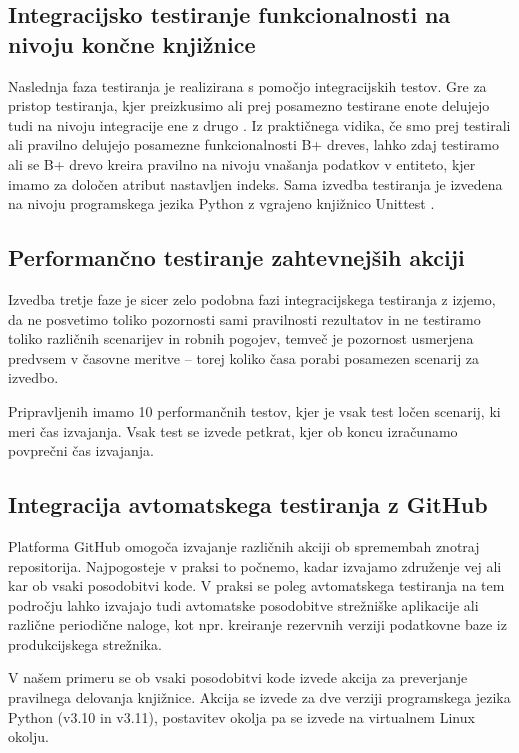 \documentclass[a4paper,12pt,openright]{book}
\begin{document}
   \subsection{Integracijsko testiranje funkcionalnosti na nivoju končne knjižnice}

    Naslednja faza testiranja je realizirana s pomočjo integracijskih testov. Gre za pristop testiranja, kjer preizkusimo ali prej posamezno testirane enote delujejo tudi na nivoju integracije ene z drugo \cite{brar2015differentiating}. Iz praktičnega vidika, če smo prej testirali ali pravilno delujejo posamezne funkcionalnosti B+ dreves, lahko zdaj testiramo ali se B+ drevo kreira pravilno na nivoju vnašanja podatkov v entiteto, kjer imamo za določen atribut nastavljen indeks. Sama izvedba testiranja je izvedena na nivoju programskega jezika Python z vgrajeno knjižnico Unittest \cite{PY_UNITTEST}.
   
   \subsection{Performančno testiranje zahtevnejših akciji}

    Izvedba tretje faze je sicer zelo podobna fazi integracijskega testiranja z izjemo, da ne posvetimo toliko pozornosti sami pravilnosti rezultatov in ne testiramo toliko različnih scenarijev in robnih pogojev, temveč je pozornost usmerjena predvsem v časovne meritve – torej koliko časa porabi posamezen scenarij za izvedbo.

    Pripravljenih imamo 10 performančnih testov, kjer je vsak test ločen scenarij, ki meri čas izvajanja. Vsak test se izvede petkrat, kjer ob koncu izračunamo povprečni čas izvajanja.
   
   \subsection{Integracija avtomatskega testiranja z GitHub}

   Platforma GitHub omogoča izvajanje različnih akciji ob spremembah znotraj repositorija. Najpogosteje v praksi to počnemo, kadar izvajamo združenje vej ali kar ob vsaki posodobitvi kode. V praksi se poleg avtomatskega testiranja na tem področju lahko izvajajo tudi avtomatske posodobitve strežniške aplikacije ali različne periodične naloge, kot npr. kreiranje rezervnih verziji podatkovne baze iz produkcijskega strežnika.

   V našem primeru se ob vsaki posodobitvi kode izvede akcija za preverjanje pravilnega delovanja knjižnice. Akcija se izvede za dve verziji programskega jezika Python (v3.10 in v3.11), postavitev okolja pa se izvede na virtualnem Linux okolju.
\end{document}
